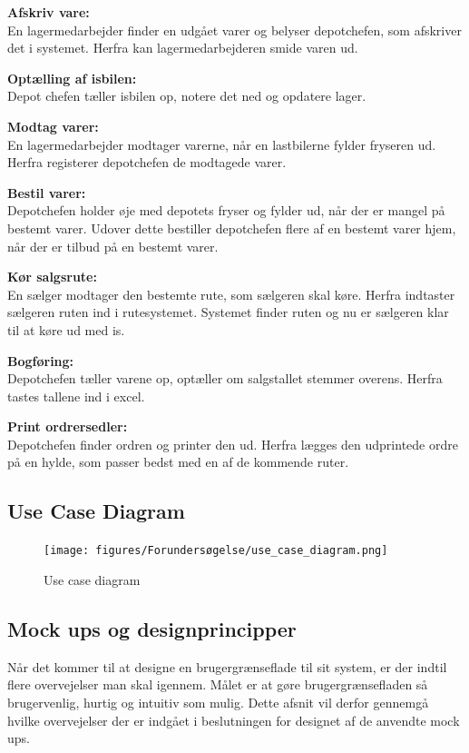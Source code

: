 \textbf{Afskriv vare:} \\
En lagermedarbejder finder en udgået varer og belyser depotchefen, som afskriver det i systemet. Herfra kan lagermedarbejderen smide varen ud. 

\textbf{Optælling af isbilen:} \\
Depot chefen tæller isbilen op, notere det ned og opdatere lager. 

\textbf{Modtag varer:} \\
En lagermedarbejder modtager varerne, når en lastbilerne fylder fryseren ud. Herfra registerer depotchefen de modtagede varer. 

\textbf{Bestil varer:} \\
Depotchefen holder øje med depotets fryser og fylder ud, når der er mangel på bestemt varer. Udover dette bestiller depotchefen flere af en bestemt varer hjem, når der er tilbud på en bestemt varer. 

\textbf{Kør salgsrute:} \\
En sælger modtager den bestemte rute, som sælgeren skal køre. Herfra indtaster sælgeren ruten ind i rutesystemet. Systemet finder ruten og nu er sælgeren klar til at køre ud med is. 

\textbf{Bogføring:} \\
Depotchefen tæller varene op, optæller om salgstallet stemmer overens. Herfra tastes tallene ind i excel. 

\textbf{Print ordrersedler:} \\
Depotchefen finder ordren og printer den ud. Herfra lægges den udprintede ordre på en hylde, som passer bedst med en af de kommende ruter.

\subsection{Use Case Diagram}

\begin{figure}[H]
    \centering
    \texttt{[image: figures/Forundersøgelse/use\_case\_diagram.png]}
    \caption{Use case diagram}
    \label{fig:use_case_diagram}
\end{figure}

\subsection{Mock ups og designprincipper}
Når det kommer til at designe en brugergrænseflade til sit system, er der indtil flere overvejelser man skal igennem. Målet er at gøre brugergrænsefladen så brugervenlig, hurtig og intuitiv som mulig. Dette afsnit vil derfor gennemgå hvilke overvejelser der er indgået i beslutningen for designet af de anvendte mock ups.


